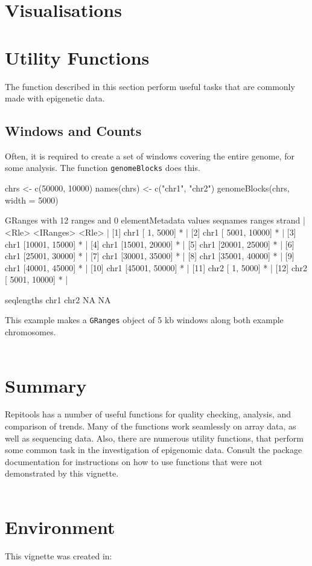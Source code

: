\documentclass[a4paper, 12pt]{article}
\begin{document}


\section{Visualisations}


\section{Utility Functions}

The function described in this section perform useful tasks that are commonly made with epigenetic data.
\subsection{Windows and Counts}
Often, it is required to create a set of windows covering the entire genome, for some analysis. The function \texttt{genomeBlocks} does this.

\begin{Schunk}
\begin{Sinput}
 chrs <- c(50000, 10000)
 names(chrs) <- c("chr1", "chr2")
 genomeBlocks(chrs, width = 5000)
\end{Sinput}
\begin{Soutput}
GRanges with 12 ranges and 0 elementMetadata values
     seqnames         ranges strand |
        <Rle>      <IRanges>  <Rle> |
 [1]     chr1 [    1,  5000]      * |
 [2]     chr1 [ 5001, 10000]      * |
 [3]     chr1 [10001, 15000]      * |
 [4]     chr1 [15001, 20000]      * |
 [5]     chr1 [20001, 25000]      * |
 [6]     chr1 [25001, 30000]      * |
 [7]     chr1 [30001, 35000]      * |
 [8]     chr1 [35001, 40000]      * |
 [9]     chr1 [40001, 45000]      * |
[10]     chr1 [45001, 50000]      * |
[11]     chr2 [    1,  5000]      * |
[12]     chr2 [ 5001, 10000]      * |

seqlengths
 chr1 chr2
   NA   NA
\end{Soutput}
\end{Schunk}

\noindent This example makes a \texttt{GRanges} object of 5 kb windows along both example chromosomes.
\ \\ \ \\


\section{Summary}
Repitools has a number of useful functions for quality checking, analysis, and comparison of trends. Many of the functions work seamlessly on array data, as well as sequencing data. Also, there are numerous utility functions, that perform some common task in the investigation of epigenomic data. Consult the package documentation for instructions on how to use functions that were not demonstrated by this vignette.
\ \\ \ \\

\section{Environment}
This vignette was created in:


\end{document}
